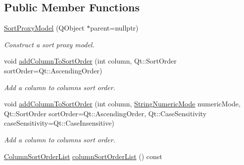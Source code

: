 \subsection*{Public Member Functions}
\begin{DoxyCompactItemize}
\item 
\hyperlink{class_mdt_1_1_item_model_1_1_sort_proxy_model_a1764706e28e183e83b51b0e349b33bff}{Sort\+Proxy\+Model} (Q\+Object $\ast$parent=nullptr)\hypertarget{class_mdt_1_1_item_model_1_1_sort_proxy_model_a1764706e28e183e83b51b0e349b33bff}{}\label{class_mdt_1_1_item_model_1_1_sort_proxy_model_a1764706e28e183e83b51b0e349b33bff}

\begin{DoxyCompactList}\small\item\em Construct a sort proxy model. \end{DoxyCompactList}\item 
void \hyperlink{class_mdt_1_1_item_model_1_1_sort_proxy_model_a5a3f0c33b558ff9ce75c827e7b699663}{add\+Column\+To\+Sort\+Order} (int column, Qt\+::\+Sort\+Order sort\+Order=Qt\+::\+Ascending\+Order)
\begin{DoxyCompactList}\small\item\em Add a column to columns sort order. \end{DoxyCompactList}\item 
void \hyperlink{class_mdt_1_1_item_model_1_1_sort_proxy_model_adfa36c9c6ec5b3f52c115725224bdb38}{add\+Column\+To\+Sort\+Order} (int column, \hyperlink{namespace_mdt_1_1_item_model_a88210a5defc335e5beaed03043620b25}{String\+Numeric\+Mode} numeric\+Mode, Qt\+::\+Sort\+Order sort\+Order=Qt\+::\+Ascending\+Order, Qt\+::\+Case\+Sensitivity case\+Sensitivity=Qt\+::\+Case\+Insensitive)
\begin{DoxyCompactList}\small\item\em Add a column to columns sort order. \end{DoxyCompactList}\item 
\hyperlink{class_mdt_1_1_item_model_1_1_column_sort_order_list}{Column\+Sort\+Order\+List} \hyperlink{class_mdt_1_1_item_model_1_1_sort_proxy_model_a9ad26aa44f91a430516189aa6a820879}{column\+Sort\+Order\+List} () const \hypertarget{class_mdt_1_1_item_model_1_1_sort_proxy_model_a9ad26aa44f91a430516189aa6a820879}{}\label{class_mdt_1_1_item_model_1_1_sort_proxy_model_a9ad26aa44f91a430516189aa6a820879}


\end{DoxyCompactItemize}

